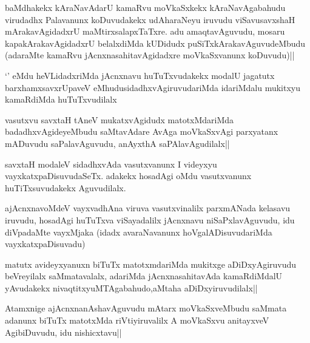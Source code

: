 
\begin{artha}
baMdhakekx kAraNavAdarU kamaRvu moVkaSxkekx kAraNavAgabahudu virudadhx Palavanunx koDuvudakekx udAharaNeyu iruvudu viSavusavxshaH mArakavAgidadxrU maMtirxsalapxTaTxre. adu amaqtavAguvudu, mosaru kapakArakavAgidadxrU belalxdiMda kUDidudx puSiTxkArakavAguvudeMbudu (adaraMte kamaRvu jAcnxnasahitavAgidadxre moVkaSxvanunx koDuvudu)||
\end{artha}


\begin{artha}
`\stext' eMdu heVLidadxriMda jAcnxnavu huTuTxvudakekx modalU jagatutx barxhamxsavxrUpaveV eMhudusidadhxvAgiruvudariMda idariMdalu mukitxyu kamaRdiMda huTuTxvudilalx
\end{artha}

\begin{artha}
vasutxvu savxtaH tAneV mukatxvAgidudx matotxMdariMda badadhxvAgideyeMbudu saMtavAdare AvAga moVkaSxvAgi parxyatanx mADuvudu saPalavAguvudu, anAyxthA saPAlavAgudilalx||
\end{artha}


\begin{artha}
savxtaH modaleV sidadhxvAda vasutxvanunx I videyxyu vayxkatxpaDisuvudaSeTx. adakekx hosadAgi oMdu vasutxvanunx huTiTxsuvudakekx Aguvudilalx.
\end{artha}

\begin{artha}
ajAcnxnavoMdeV vayxvadhAna viruva vasutxvinalilx parxmANada kelasavu iruvudu, hosadAgi huTuTxva viSayadalilx jAcnxnavu niSaPxlavAguvudu, idu diVpadaMte vayxMjaka (idadx avaraNavanunx hoVgalADisuvudariMda vayxkatxpaDisuvadu)
\end{artha}


\begin{artha}
matutx avideyxyanuxn biTuTx matotxmdariMda mukitxge aDiDxyAgiruvudu beVreyilalx saMmatavalalx, adariMda jAcnxnasahitavAda kamaRdiMdalU yAvudakekx nivaqtitxyuMTAgabahudo,aMtaha aDiDxyiruvudilalx||
\end{artha}

\begin{artha}
Atamxnige ajAcnxnanAshavAguvudu mAtarx moVkaSxveMbudu saMmata adanunx biTuTx matotxMda riVtiyiruvalilx A moVkaSxvu anitayxveV AgibiDuvudu, idu nishicxtavu||
\end{artha}

